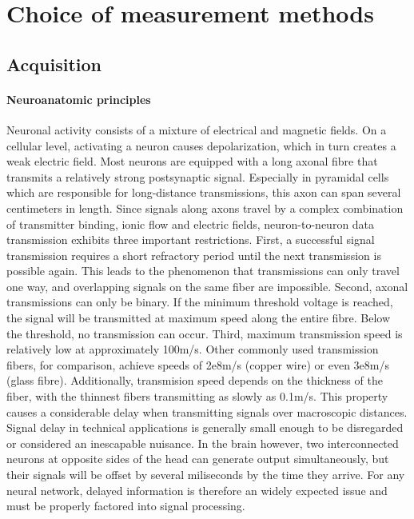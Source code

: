 \section{Choice of measurement methods}

\subsection{Acquisition}

\paragraph{Neuroanatomic principles}
Neuronal activity consists of a mixture of electrical and magnetic fields.
On a cellular level, activating a neuron causes depolarization, which in turn creates a weak electric field.
Most neurons are equipped with a long axonal fibre that transmits a relatively strong postsynaptic signal.
Especially in pyramidal cells which are responsible for long-distance transmissions, this axon can span several centimeters in length.
Since signals along axons travel by a complex combination of transmitter binding, ionic flow and electric fields, neuron-to-neuron data transmission exhibits three important restrictions.
First, a successful signal transmission requires a short refractory period until the next transmission is possible again.
This leads to the phenomenon that transmissions can only travel one way, and overlapping signals on the same fiber are impossible.
Second, axonal transmissions can only be binary.
If the minimum threshold voltage is reached, the signal will be transmitted at maximum speed along the entire fibre.
Below the threshold, no transmission can occur.
Third, maximum transmission speed is relatively low at approximately 100m/s.
Other commonly used transmission fibers, for comparison, achieve speeds of 2e8m/s (copper wire) or even 3e8m/s (glass fibre).
Additionally, transmision speed depends on the thickness of the fiber, with the thinnest fibers transmitting as slowly as 0.1m/s.
This property causes a considerable delay when transmitting signals over macroscopic distances.
Signal delay in technical applications is generally small enough to be disregarded or considered an inescapable nuisance.
In the brain however, two interconnected neurons at opposite sides of the head can generate output simultaneously, but their signals will be offset by several miliseconds by the time they arrive.
For any neural network, delayed information is therefore an widely expected issue and must be properly factored into signal processing.

